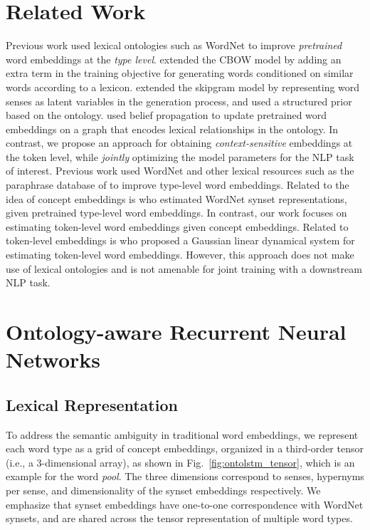 \section{Related Work}
Previous work used lexical ontologies such as WordNet to improve \textit{pretrained} word embeddings at the \textit{type level}.
\cite{yu:14} extended the CBOW model \citep{mikolov:13} by adding an extra term in the training objective for generating words conditioned on similar words according to a lexicon.
\cite{jauhar:15} extended the skipgram model \citep{mikolov:13} by representing word senses as latent variables in the generation process, and used a structured prior based on the ontology.
\cite{faruqui:15} used belief propagation to update pretrained word embeddings on a graph that encodes lexical relationships in the ontology.
In contrast, we propose an approach for obtaining \textit{context-sensitive} embeddings at the token level, while \textit{jointly} optimizing the model parameters for the NLP task of interest.
Previous work used WordNet and other lexical resources such as the paraphrase database of \cite{ganitkevitch:13} to improve type-level word embeddings.
Related to the idea of concept embeddings is \cite{rothe:15} who estimated WordNet synset representations, given pretrained type-level word embeddings.
 In contrast, our work focuses on estimating token-level word embeddings given concept embeddings.
 Related to token-level embeddings is \cite{belanger:15} who proposed a Gaussian linear dynamical system for estimating token-level word embeddings. However, this approach does not make use of lexical ontologies and is not amenable for joint training with a downstream NLP task.

\section{Ontology-aware Recurrent Neural Networks}
\subsection{Lexical Representation}
\label{sec:ontolstm_input_rep}
To address the semantic ambiguity in traditional word embeddings, we represent each word type as a grid of concept embeddings, organized in a third-order tensor (i.e., a 3-dimensional array), as shown in Fig.~\ref{fig:ontolstm_tensor}, 
which is an example for the word \textit{pool}. The three dimensions correspond to senses, hypernyms per sense, and dimensionality of the synset embeddings respectively. We emphasize that synset embeddings have one-to-one correspondence with WordNet synsets,
and are shared across the tensor representation of multiple word types.

